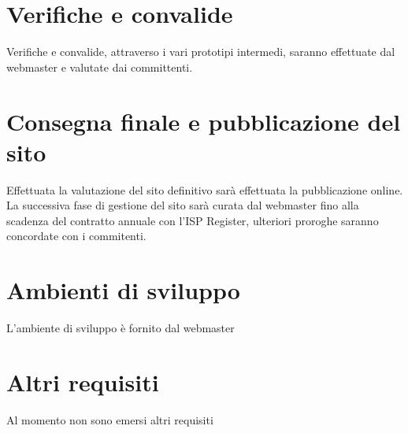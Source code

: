 \documentclass[a4paper]{report}	%
\begin{document}
\section{Verifiche e convalide}
Verifiche e convalide, attraverso i vari prototipi intermedi, saranno effettuate dal webmaster e valutate dai committenti. 

\section{Consegna finale e pubblicazione del sito}
Effettuata la valutazione del sito definitivo sarà effettuata la pubblicazione online. La successiva fase di gestione del sito sarà curata dal webmaster fino alla scadenza del contratto annuale con l'ISP Register, ulteriori proroghe saranno concordate con i commitenti.

\section{Ambienti di sviluppo}
L'ambiente di sviluppo è fornito dal webmaster

\section{Altri requisiti}
Al momento non sono emersi altri requisiti

\appendix
\end{document}
